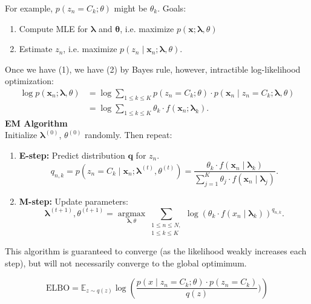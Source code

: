 \documentclass[10pt,landscape]{article}
\begin{document}
\begin{multicols*}{3}
	For example, $p(z_n = C_k; \theta)$ might be $\theta_k$. Goals:
	\begin{enumerate}
		\item Compute MLE for $\pmb{\lambda}$ and $\pmb{\theta}$, i.e. maximize $p(\mathbf{x}; \pmb{\lambda}, \theta)$
		\item Estimate $z_n$, i.e. maximize $p(z_n \mid \mathbf{x}_n; \pmb{\lambda}, \theta)$.
	\end{enumerate}
	Once we have (1), we have (2) by Bayes rule, however, intractible log-likelihood optimization:
	\[
		\begin{aligned}
			\log p(\mathbf{x}_n; \pmb{\lambda}, \theta)
			 & = \log \sum_{1\leq k \leq K} p(z_n = C_k; \theta)\cdot p(\mathbf{x}_n \mid z_n = C_k; \pmb{\lambda},\theta) \\
			 & = \log \sum_{1\leq k \leq K} \theta_k\cdot f(\mathbf{x}_n; \pmb{\lambda}_k).
		\end{aligned}
	\]
	\smallskip\smallskip
	\textbf{EM Algorithm}\\
	Initialize $\mathbf{\lambda}^{(0)}$, $\theta^{(0)}$ randomly. Then repeat:
	\begin{enumerate}
		\item \textbf{E-step:} Predict distribution $\textbf{q}$ for $z_n$.
		      \[q_{n,k} = p(z_n = C_k\mid \mathbf{x}_n; \pmb{\lambda}^{(t)}, \theta^{(t)}) = \frac{\theta_k \cdot f(\mathbf{x}_n \mid \pmb{\lambda}_k)}{\sum_{j=1}^K \theta_j \cdot f(\mathbf{x}_n \mid \pmb{\lambda}_j)}.\]
		\item \textbf{M-step:} Update parameters:
		      \[
			      \pmb{\lambda}^{(t+1)},\theta^{(t+1)} = \mathop{\mathrm{argmax}}\limits_{\pmb{\lambda}, \theta} \sum_{\substack{1\leq n \leq N,\\ 1\leq k \leq K}} \log (\theta_k\cdot f(x_n\mid \pmb{\lambda}_k))^{q_{n,k}}.
		      \]
	\end{enumerate}

	This algorithm is guaranteed to converge (as the likelihood weakly increases each step), but will not necessarily converge to the global optimimum.

	\[\textrm{ELBO} = \mathbb{E}_{z\sim q(z)}\log\left(\frac{p(x \mid z_n = C_k; \theta) \cdot p(z_n = C_k)}{q(z)})\right)\]

	\begin{center}
	\end{center}


\end{multicols*}
\end{document}
